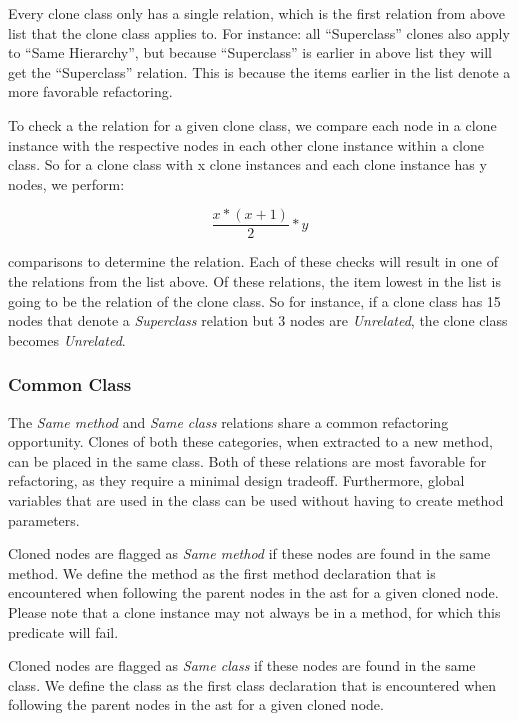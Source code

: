 Every clone class only has a single relation, which is the first relation from above list that the clone class applies to. For instance: all ``Superclass'' clones also apply to ``Same Hierarchy'', but because ``Superclass'' is earlier in above list they will get the ``Superclass'' relation. This is because the items earlier in the list denote a more favorable refactoring.

To check a the relation for a given clone class, we compare each node in a clone instance with the respective nodes in each other clone instance within a clone class. So for a clone class with x clone instances and each clone instance has y nodes, we perform:

\begin{equation}\label{eq:sameclass}
\frac{x * (x + 1)}{2} * y
\end{equation}

comparisons to determine the relation. Each of these checks will result in one of the relations from the list above. Of these relations, the item lowest in the list is going to be the relation of the clone class. So for instance, if a clone class has 15 nodes that denote a \textit{Superclass} relation but 3 nodes are \textit{Unrelated}, the clone class becomes \textit{Unrelated}.

\subsubsection{Common Class}
The \textit{Same method} and \textit{Same class} relations share a common refactoring opportunity. Clones of both these categories, when extracted to a new method, can be placed in the same class. Both of these relations are most favorable for refactoring, as they require a minimal design tradeoff. Furthermore, global variables that are used in the class can be used without having to create method parameters.

Cloned nodes are flagged as \textit{Same method} if these nodes are found in the same method. We define the method as the first method declaration that is encountered when following the parent nodes in the ast for a given cloned node. Please note that a clone instance may not always be in a method, for which this predicate will fail.

Cloned nodes are flagged as \textit{Same class} if these nodes are found in the same class. We define the class as the first class declaration that is encountered when following the parent nodes in the ast for a given cloned node.

